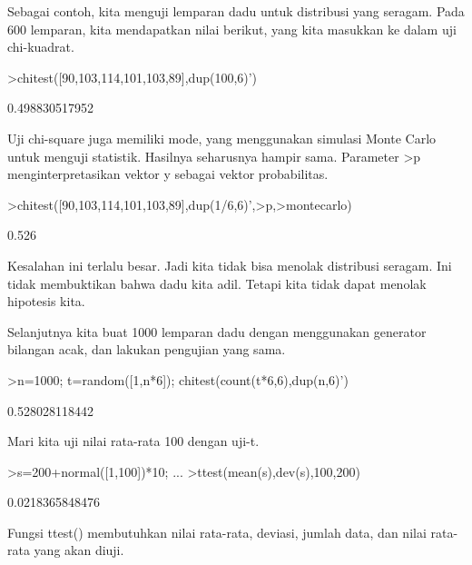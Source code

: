 \documentclass{article}
\begin{document}
\begin{eulernotebook}
\begin{eulercomment}
Sebagai contoh, kita menguji lemparan dadu untuk distribusi yang
seragam. Pada 600 lemparan, kita mendapatkan nilai berikut, yang kita
masukkan ke dalam uji chi-kuadrat.
\end{eulercomment}
\begin{eulerprompt}
>chitest([90,103,114,101,103,89],dup(100,6)')
\end{eulerprompt}
\begin{euleroutput}
  0.498830517952
\end{euleroutput}
\begin{eulercomment}
Uji chi-square juga memiliki mode, yang menggunakan simulasi Monte
Carlo untuk menguji statistik. Hasilnya seharusnya hampir sama.
Parameter \textgreater{}p menginterpretasikan vektor y sebagai vektor probabilitas.
\end{eulercomment}
\begin{eulerprompt}
>chitest([90,103,114,101,103,89],dup(1/6,6)',>p,>montecarlo)
\end{eulerprompt}
\begin{euleroutput}
  0.526
\end{euleroutput}
\begin{eulercomment}
Kesalahan ini terlalu besar. Jadi kita tidak bisa menolak distribusi
seragam. Ini tidak membuktikan bahwa dadu kita adil. Tetapi kita tidak
dapat menolak hipotesis kita.

Selanjutnya kita buat 1000 lemparan dadu dengan menggunakan generator
bilangan acak, dan lakukan pengujian yang sama.
\end{eulercomment}
\begin{eulerprompt}
>n=1000; t=random([1,n*6]); chitest(count(t*6,6),dup(n,6)')
\end{eulerprompt}
\begin{euleroutput}
  0.528028118442
\end{euleroutput}
\begin{eulercomment}
Mari kita uji nilai rata-rata 100 dengan uji-t.
\end{eulercomment}
\begin{eulerprompt}
>s=200+normal([1,100])*10; ...
>ttest(mean(s),dev(s),100,200)
\end{eulerprompt}
\begin{euleroutput}
  0.0218365848476
\end{euleroutput}
\begin{eulercomment}
Fungsi ttest() membutuhkan nilai rata-rata, deviasi, jumlah data, dan
nilai rata-rata yang akan diuji.


\end{eulercomment}
\end{eulernotebook}
\end{document}
